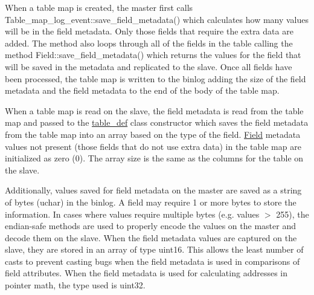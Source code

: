 When a table map is created, the master first calls Table\+\_\+map\+\_\+log\+\_\+event\+::save\+\_\+field\+\_\+metadata() which calculates how many values will be in the field metadata. Only those fields that require the extra data are added. The method also loops through all of the fields in the table calling the method Field\+::save\+\_\+field\+\_\+metadata() which returns the values for the field that will be saved in the metadata and replicated to the slave. Once all fields have been processed, the table map is written to the binlog adding the size of the field metadata and the field metadata to the end of the body of the table map.

When a table map is read on the slave, the field metadata is read from the table map and passed to the \mbox{\hyperlink{classtable__def}{table\+\_\+def}} class constructor which saves the field metadata from the table map into an array based on the type of the field. \mbox{\hyperlink{classField}{Field}} metadata values not present (those fields that do not use extra data) in the table map are initialized as zero (0). The array size is the same as the columns for the table on the slave.

Additionally, values saved for field metadata on the master are saved as a string of bytes (uchar) in the binlog. A field may require 1 or more bytes to store the information. In cases where values require multiple bytes (e.\+g. values $>$ 255), the endian-\/safe methods are used to properly encode the values on the master and decode them on the slave. When the field metadata values are captured on the slave, they are stored in an array of type uint16. This allows the least number of casts to prevent casting bugs when the field metadata is used in comparisons of field attributes. When the field metadata is used for calculating addresses in pointer math, the type used is uint32. 